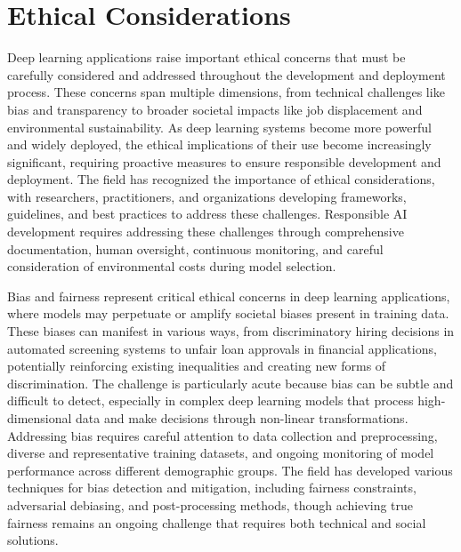 
\section{Ethical Considerations }
\label{sec:ethics}

Deep learning applications raise important ethical concerns that must be carefully considered and addressed throughout the development and deployment process. These concerns span multiple dimensions, from technical challenges like bias and transparency to broader societal impacts like job displacement and environmental sustainability. As deep learning systems become more powerful and widely deployed, the ethical implications of their use become increasingly significant, requiring proactive measures to ensure responsible development and deployment. The field has recognized the importance of ethical considerations, with researchers, practitioners, and organizations developing frameworks, guidelines, and best practices to address these challenges. Responsible AI development requires addressing these challenges through comprehensive documentation, human oversight, continuous monitoring, and careful consideration of environmental costs during model selection.

Bias and fairness represent critical ethical concerns in deep learning applications, where models may perpetuate or amplify societal biases present in training data. These biases can manifest in various ways, from discriminatory hiring decisions in automated screening systems to unfair loan approvals in financial applications, potentially reinforcing existing inequalities and creating new forms of discrimination. The challenge is particularly acute because bias can be subtle and difficult to detect, especially in complex deep learning models that process high-dimensional data and make decisions through non-linear transformations. Addressing bias requires careful attention to data collection and preprocessing, diverse and representative training datasets, and ongoing monitoring of model performance across different demographic groups. The field has developed various techniques for bias detection and mitigation, including fairness constraints, adversarial debiasing, and post-processing methods, though achieving true fairness remains an ongoing challenge that requires both technical and social solutions.

